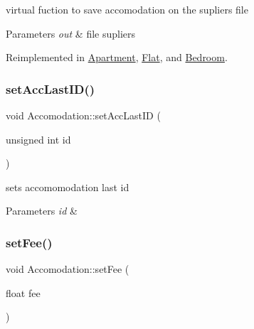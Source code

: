 virtual fuction to save accomodation on the supliers file 


\begin{DoxyParams}{Parameters}
{\em out} & file supliers \\
\hline
\end{DoxyParams}


Reimplemented in \hyperlink{class_apartment_af30f7fa6ee2877315b553614dcfad9f2}{Apartment}, \hyperlink{class_flat_a9569fe297d02edebfe67d62125a86696}{Flat}, and \hyperlink{class_bedroom_ad5d0a12fe0257ba5c14efc6182ee33ce}{Bedroom}.

\hypertarget{class_accomodation_a5554cdc8b46ae1fb92c94bf4696f9b77}{}\label{class_accomodation_a5554cdc8b46ae1fb92c94bf4696f9b77} 
\subsubsection{\texorpdfstring{set\+Acc\+Last\+I\+D()}{setAccLastID()}}
{\footnotesize\ttfamily void Accomodation\+::set\+Acc\+Last\+ID (\begin{DoxyParamCaption}\item[{unsigned int}]{id }\end{DoxyParamCaption})\hspace{0.3cm}{\ttfamily [static]}}



sets accomomodation last id 


\begin{DoxyParams}{Parameters}
{\em id} & \\
\hline
\end{DoxyParams}
\hypertarget{class_accomodation_a9fc9164c6a0a353538e422ec36db43f4}{}\label{class_accomodation_a9fc9164c6a0a353538e422ec36db43f4} 
\subsubsection{\texorpdfstring{set\+Fee()}{setFee()}}
{\footnotesize\ttfamily void Accomodation\+::set\+Fee (\begin{DoxyParamCaption}\item[{float}]{fee }\end{DoxyParamCaption})\hspace{0.3cm}{\ttfamily [inline]}}



